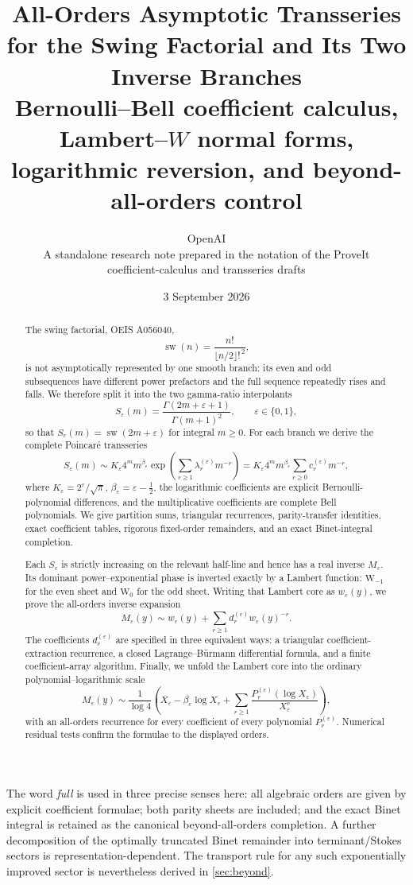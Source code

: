 \documentclass[11pt,a4paper]{article}
\title{\vspace{-1.5cm}\textbf{All-Orders Asymptotic Transseries for the Swing Factorial and Its Two Inverse Branches}\\[0.35em]
\large Bernoulli--Bell coefficient calculus, Lambert--\(W\) normal forms,\\[-0.05em]
\large logarithmic reversion, and beyond-all-orders control}
\author{OpenAI\\\small A standalone research note prepared in the notation of the ProveIt\\[-0.1em]
\small coefficient-calculus and transseries drafts}
\date{3 September 2026}
\theoremstyle{clean}
\theoremstyle{definition}
\newcommand{\sw}{\operatorname{sw}}
\newcommand{\eps}{\varepsilon}
\newcommand{\be}{\beta}
\newcommand{\W}{\mathrm W}
\begin{document}
\maketitle

\begin{abstract}
The swing factorial, OEIS A056040,
\[
  \sw(n)=\frac{n!}{\lfloor n/2\rfloor!^{\,2}},
\]
is not asymptotically represented by one smooth branch: its even and odd subsequences have different power prefactors and the full sequence repeatedly rises and falls.  We therefore split it into the two gamma-ratio interpolants
\[
  S_\eps(m)=\frac{\Gamma(2m+\eps+1)}{\Gamma(m+1)^2},\qquad \eps\in\{0,1\},
\]
so that \(S_\eps(m)=\sw(2m+\eps)\) for integral \(m\geq0\).  For each branch we derive the complete Poincar\'e transseries
\[
 S_\eps(m)\sim K_\eps 4^m m^{\be_\eps}
 \exp\!\left(\sum_{r\geq1}\lambda_r^{(\eps)}m^{-r}\right)
 =K_\eps4^m m^{\be_\eps}\sum_{r\geq0}c_r^{(\eps)}m^{-r},
\]
where \(K_\eps=2^\eps/\sqrt\pi\), \(\be_\eps=\eps-\tfrac12\), the logarithmic coefficients are explicit Bernoulli-polynomial differences, and the multiplicative coefficients are complete Bell polynomials.  We give partition sums, triangular recurrences, parity-transfer identities, exact coefficient tables, rigorous fixed-order remainders, and an exact Binet-integral completion.

Each \(S_\eps\) is strictly increasing on the relevant half-line and hence has a real inverse \(M_\eps\).  Its dominant power--exponential phase is inverted exactly by a Lambert function: \(\W_{-1}\) for the even sheet and \(\W_0\) for the odd sheet.  Writing that Lambert core as \(w_\eps(y)\), we prove the all-orders inverse expansion
\[
  M_\eps(y)\sim w_\eps(y)+\sum_{r\geq1}d_r^{(\eps)}w_\eps(y)^{-r}.
\]
The coefficients \(d_r^{(\eps)}\) are specified in three equivalent ways: a triangular coefficient-extraction recurrence, a closed Lagrange--B\"urmann differential formula, and a finite coefficient-array algorithm.  Finally, we unfold the Lambert core into the ordinary polynomial--logarithmic scale
\[
 M_\eps(y)\sim \frac1{\log4}\left(X_\eps-\be_\eps\log X_\eps+
 \sum_{r\geq1}\frac{P_r^{(\eps)}(\log X_\eps)}{X_\eps^r}\right),
\]
with an all-orders recurrence for every coefficient of every polynomial \(P_r^{(\eps)}\).  Numerical residual tests confirm the formulae to the displayed orders.
\end{abstract}

\begin{summarybox}
The word \emph{full} is used in three precise senses here: all algebraic orders are given by explicit coefficient formulae; both parity sheets are included; and the exact Binet integral is retained as the canonical beyond-all-orders completion.  A further decomposition of the optimally truncated Binet remainder into terminant/Stokes sectors is representation-dependent.  The transport rule for any such exponentially improved sector is nevertheless derived in \cref{sec:beyond}.
\end{summarybox}
\end{document}
